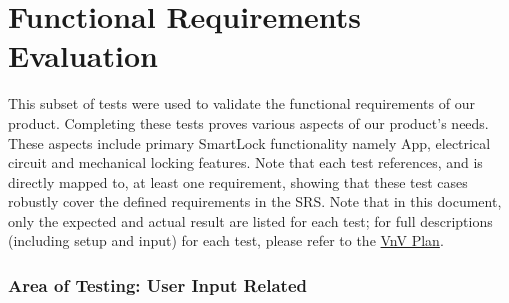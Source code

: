 \documentclass[12pt, titlepage]{article}
\begin{document}
\section{Functional Requirements Evaluation}

This subset of tests were used to validate the functional requirements of our product. Completing these tests proves various aspects of our product's needs. These aspects include primary SmartLock functionality namely App, electrical circuit and mechanical locking features. Note that each test references, and is directly mapped to, at least one requirement, showing that these test cases robustly cover the defined requirements in the SRS. Note that in this document, only the expected and actual result are listed for each test; for full descriptions (including setup and input) for each test, please refer to the \href{https://github.com/NevoAbigail/Capstone/blob/main/docs/VnVPlan/VnVPlan.pdf}{VnV Plan}.

\subsubsection{Area of Testing: User Input Related}
\end{document}
